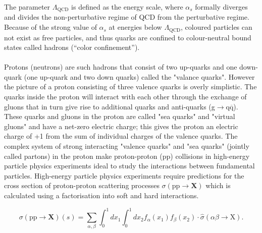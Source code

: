 The parameter $\Lambda_{\text{QCD}}$ is defined as the energy scale, where $\alpha_s$ formally diverges and divides the non-perturbative regime of QCD from the perturbative regime. Because of the strong value of $\alpha_s$ at energies below $\Lambda_{\text{QCD}}$, coloured particles can not exist as free particles, and thus quarks are confined to colour-neutral bound states called hadrons (“color confinement”).\\
\\
Protons (neutrons) are such hadrons that consist of two up-quarks and one down-quark (one up-quark and two down quarks) called the "valance quarks". However the picture of a proton consisting of three valence quarks is overly simplistic.
The quarks inside the proton will interact with each other through the exchange of gluons that in turn give rise to additional quarks and anti-quarks (g$\to$q$\overline{\text{q}}$). These quarks and gluons in the proton are called "sea quarks" and "virtual gluons" and have a net-zero electric charge; this gives the proton an electric charge of +1 from the sum of individual charges of the valence quarks. The complex system of strong interacting "valence quarks" and "sea quarks" (jointly called partons) in the proton make proton-proton (pp) collisions in high-energy particle physics experiments ideal to study the interactions between fundamental particles. High-energy particle physics experiments require predictions for the cross section of proton-proton scattering processes $\sigma(\text{pp}\to\textbf{X})$ which is calculated using a factorisation into soft and hard interactions.

\begin{equation}\label{pp cross section}
    \sigma(\text{pp}\to\textbf{X})(s) = \sum_{\alpha,\beta}\int^1_0{dx_1}\int^1_0{dx_2 f_\alpha(x_1) f_\beta(x_2) \cdot \hat{\sigma}(\alpha \beta \to \text{X})}.
\end{equation}

